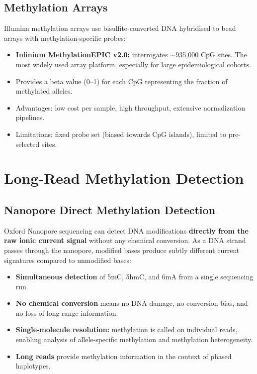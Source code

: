 \subsection{Methylation Arrays}

Illumina methylation arrays use bisulfite-converted DNA hybridised to bead arrays with methylation-specific probes:

\begin{itemize}[itemsep=2pt]
  \item \textbf{Infinium MethylationEPIC v2.0:} interrogates $\sim$935,000 CpG sites. The most widely used array platform, especially for large epidemiological cohorts.
  \item Provides a beta value (0--1) for each CpG representing the fraction of methylated alleles.
  \item Advantages: low cost per sample, high throughput, extensive normalization pipelines.
  \item Limitations: fixed probe set (biased towards CpG islands), limited to pre-selected sites.
\end{itemize}

\section{Long-Read Methylation Detection}
\label{sec:methylation:longread}

\subsection{Nanopore Direct Methylation Detection}
\label{subsec:methylation:nanopore}

Oxford Nanopore sequencing can detect DNA modifications \textbf{directly from the raw ionic current signal} without any chemical conversion. As a DNA strand passes through the nanopore, modified bases produce subtly different current signatures compared to unmodified bases:

\begin{itemize}[itemsep=3pt]
  \item \textbf{Simultaneous detection} of 5mC, 5hmC, and 6mA from a single sequencing run.
  \item \textbf{No chemical conversion} means no DNA damage, no conversion bias, and no loss of long-range information.
  \item \textbf{Single-molecule resolution:} methylation is called on individual reads, enabling analysis of allele-specific methylation and methylation heterogeneity.
  \item \textbf{Long reads} provide methylation information in the context of phased haplotypes.
\end{itemize}

